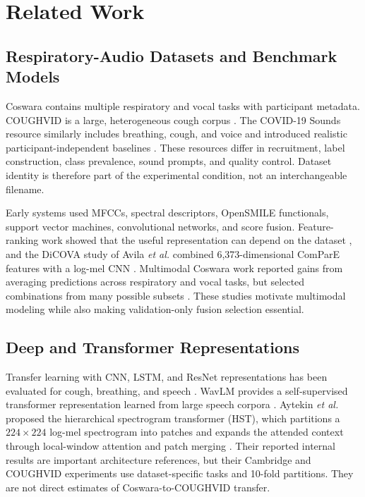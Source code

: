 \section{Related Work}

\subsection{Respiratory-Audio Datasets and Benchmark Models}

Coswara contains multiple respiratory and vocal tasks with participant
metadata. COUGHVID is a large, heterogeneous cough corpus
\cite{bhattacharya2023coswara,orlandic2021coughvid}. The COVID-19 Sounds resource
similarly includes breathing, cough, and voice and introduced realistic
participant-independent baselines \cite{xia2021covid}. These resources differ
in recruitment, label construction, class prevalence, sound prompts, and
quality control. Dataset identity is therefore part of the experimental
condition, not an interchangeable filename.

Early systems used MFCCs, spectral descriptors, OpenSMILE functionals, support
vector machines, convolutional networks, and score fusion. Feature-ranking
work showed that the useful representation can depend on the dataset
\cite{meister2022ranking}, and the DiCOVA study of Avila \emph{et al.} combined
6,373-dimensional ComParE features with a log-mel CNN
\cite{avila2021feature}. Multimodal Coswara work reported gains from averaging
predictions across respiratory and vocal tasks, but selected combinations from
many possible subsets \cite{chetupalli2023multimodal}. These studies motivate multimodal
modeling while also making validation-only fusion selection essential.

\subsection{Deep and Transformer Representations}

Transfer learning with CNN, LSTM, and ResNet representations has been evaluated
for cough, breathing, and speech \cite{pahar2022transfer}. WavLM provides a
self-supervised transformer representation learned from large speech corpora
\cite{chen2022wavlm}. Aytekin \emph{et al.} proposed the hierarchical
spectrogram transformer (HST), which partitions a $224\times224$ log-mel
spectrogram into patches and expands the attended context through local-window
attention and patch merging \cite{aytekin2024hst}. Their reported internal
results are important architecture references, but their Cambridge and
COUGHVID experiments use dataset-specific tasks and 10-fold partitions. They
are not direct estimates of Coswara-to-COUGHVID transfer.

